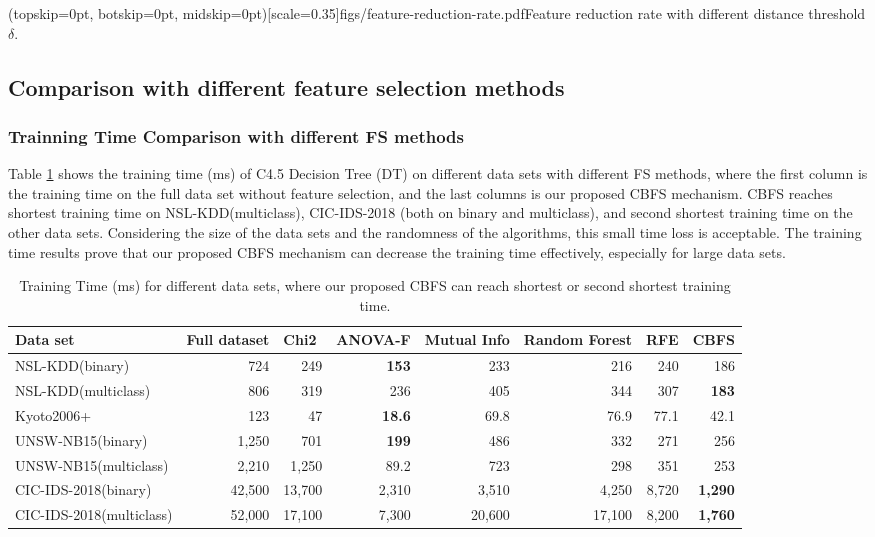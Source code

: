 \documentclass{ieeeaccess}
\theoremstyle{definition}
\begin{document}
\Figure[!htpb](topskip=0pt, botskip=0pt, midskip=0pt)[scale=0.35]{figs/feature-reduction-rate.pdf}{Feature reduction rate with different distance threshold $\delta$. \label{fig:feature-reduction-rate}}

\subsection{Comparison with different feature selection methods}

\subsubsection{Trainning Time Comparison with different FS methods}

Table \ref{tab:training-time} shows the training time (ms) of C4.5 Decision Tree (DT) \cite{quinlan2014c4} on different data sets with different FS methods, where the first column is the training time on the full data set without feature selection, and the last columns is our proposed CBFS mechanism. CBFS reaches shortest training time on NSL-KDD(multiclass), CIC-IDS-2018 (both on binary and multiclass), and second shortest training time on the other data sets. Considering the size of the data sets and the randomness of the algorithms, this small time loss is acceptable. The training time results prove that our proposed CBFS mechanism can decrease the training time effectively, especially for large data sets.

\begin{table}[htbp]
    \centering
    \caption{Training Time (ms) for different data sets, where our proposed CBFS can reach shortest or second shortest training time.}
    \begin{tabular}{lrrrrrrr}
        \toprule
        Data set & \multicolumn{1}{l}{Full dataset} & \multicolumn{1}{l}{Chi2} & \multicolumn{1}{l}{ANOVA-F} & \multicolumn{1}{l}{Mutual Info} & \multicolumn{1}{l}{Random Forest} & \multicolumn{1}{l}{RFE} & \multicolumn{1}{l}{CBFS} \\
        \midrule
        NSL-KDD(binary) & 724   & 249   & \textbf{153} & 233   & 216   & 240   & 186 \\
        NSL-KDD(multiclass) & 806   & 319   & 236   & 405   & 344   & 307   & \textbf{183} \\
        Kyoto2006+ & 123   & 47    & \textbf{18.6} & 69.8  & 76.9  & 77.1  & 42.1 \\
        UNSW-NB15(binary) & 1,250  & 701   & \textbf{199} & 486   & 332   & 271   & 256 \\
        UNSW-NB15(multiclass) & 2,210  & 1,250  & 89.2  & 723   & 298   & 351   & 253 \\
        CIC-IDS-2018(binary) & 42,500 & 13,700 & 2,310  & 3,510  & 4,250  & 8,720  & \textbf{1,290} \\
        CIC-IDS-2018(multiclass) & 52,000 & 17,100 & 7,300  & 20,600 & 17,100 & 8,200  & \textbf{1,760} \\
        \bottomrule
        \end{tabular}%
    \label{tab:training-time}%
\end{table}%
\end{document}
